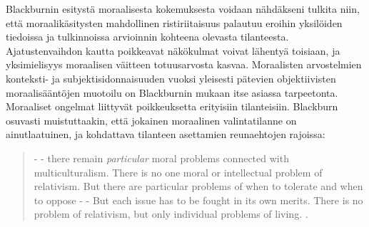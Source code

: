 \documentclass[a4paper,12pt,times,titlepage,finnish]{article}
\begin{document}
Blackburnin esitystä moraalisesta kokemuksesta voidaan näh\-däk\-se\-ni tulkita niin, että moraalikäsitysten mahdollinen ristiriitaisuus palautuu eroihin yksilöiden tiedoissa ja tulkinnoissa arvioinnin kohteena olevasta tilanteesta. Aja\-tus\-ten\-vaih\-don kautta poikkeavat näkökulmat voivat lähentyä toisiaan, ja yksimielisyys moraalisen väitteen totuusarvosta kasvaa. Moraalisten arvostelmien konteksti- ja subjektisidonnaisuuden vuoksi yleisesti pätevien objektiivisten mo\-raa\-li\-sään\-tö\-jen muotoilu on Blackburnin mukaan itse asiassa tarpeetonta. Moraaliset ongelmat liittyvät poikkeuksetta erityisiin tilanteisiin. Blackburn osuvasti muistuttaakin, että jokainen moraalinen valintatilanne on ainutlaatuinen, ja kohdattava tilanteen asettamien reunaehtojen rajoissa:

\begin{quote}
	- - there remain {\it particular} moral problems connected with multiculturalism. There is no one moral or intellectual problem of relativism. But there are particular problems of when to tolerate and when to oppose - - But each issue has to be fought in its own merits. There is no problem of relativism, but only individual problems of living. \citep[218]{Blackburn99}.
\end{quote}

\pagebreak
{}

%
%
\end{document}
